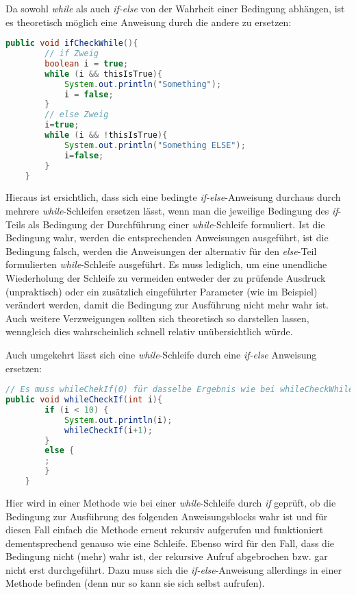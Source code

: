 \documentclass{pi1}
\begin{document}
Da sowohl \emph{while} als auch \emph{if-else} von der Wahrheit einer Bedingung abhängen, ist es theoretisch möglich eine Anweisung durch die andere zu ersetzen:

\begin{lstlisting}[caption={}, firstnumber=1, language=Java]
public void ifCheckWhile(){
        // if Zweig
        boolean i = true;
        while (i && thisIsTrue){
            System.out.println("Something");
            i = false;
        }
        // else Zweig
        i=true;
        while (i && !thisIsTrue){
            System.out.println("Something ELSE");
            i=false;
        }
    }
\end{lstlisting}

Hieraus ist ersichtlich, dass sich eine bedingte \emph{if-else}-Anweisung durchaus durch mehrere \emph{while}-Schleifen ersetzen lässt, wenn man die jeweilige Bedingung des \emph{if}-Teils als Bedingung der Durchführung einer \emph{while}-Schleife formuliert. Ist die Bedingung wahr, werden die entsprechenden Anweisungen ausgeführt, ist die Bedingung falsch, werden die Anweisungen der alternativ für den \emph{else}-Teil formulierten \emph{while}-Schleife ausgeführt. Es muss lediglich, um eine unendliche Wiederholung der Schleife zu vermeiden entweder der zu prüfende Ausdruck (unpraktisch) oder ein zusätzlich eingeführter Parameter (wie im Beispiel) verändert werden, damit die Bedingung zur Ausführung nicht mehr wahr ist. Auch weitere Verzweigungen sollten sich theoretisch so darstellen lassen, wenngleich dies wahrscheinlich schnell relativ unübersichtlich würde.

Auch umgekehrt lässt sich eine \emph{while}-Schleife durch eine \emph{if-else} Anweisung ersetzen:

\begin{lstlisting}[caption={}, firstnumber=1, language=Java]
// Es muss whileChekIf(0) für dasselbe Ergebnis wie bei whileCheckWhile() ausgeführt werden
public void whileCheckIf(int i){
        if (i < 10) {
            System.out.println(i);
            whileCheckIf(i+1);
        }
        else {
        ;    
        }
    }\end{lstlisting}

Hier wird in einer Methode wie bei einer \emph{while}-Schleife durch \emph{if} geprüft, ob die Bedingung zur Ausführung des folgenden Anweisungsblocks wahr ist und für diesen Fall einfach die Methode erneut rekursiv aufgerufen und funktioniert dementsprechend genauso wie eine Schleife. Ebenso wird für den Fall, dass die Bedingung nicht (mehr) wahr ist, der rekursive Aufruf abgebrochen bzw. gar nicht erst durchgeführt. Dazu muss sich die \emph{if-else}-Anweisung allerdings in einer Methode befinden (denn nur so kann sie sich selbst aufrufen).
\end{document}
